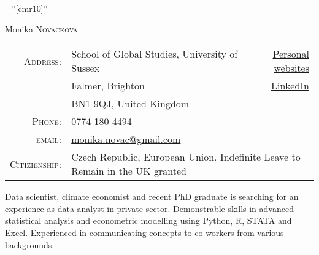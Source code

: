 \documentclass[a4paper,10pt]{article}
\begin{document}

\pagestyle{empty} %

\font\fb=''[cmr10]'' %

\par{\centering
		{\Huge Monika \textsc{Novackova}
	}\bigskip\par}


\begin{tabular}{rlr}
 
    \textsc{Address:}   & School of Global Studies, University of Sussex&  \href{https://monikanovackova.github.io/0}{Personal websites} \\
 & Falmer, Brighton&  \href{https://www.linkedin.com/in/monika-novackova/}{LinkedIn}\\
  &BN1 9QJ, United Kingdom\\
    \textsc{Phone:}     & 0774 180 4494\\
    \textsc{email:}     & \href{mailto:monika.novac@gmail.com}{monika.novac@gmail.com}    \\
    
       \textsc{Citizienship:} & \multicolumn{2}{l}{Czech Republic, European Union. Indefinite Leave to Remain in the UK granted}
\end{tabular}

Data scientist, climate economist and recent PhD graduate is searching for an experience as data analyst in private sector. Demonstrable skills in advanced statistical analysis and econometric modelling using Python, R, STATA and Excel. Experienced in communicating concepts to co-workers from various backgrounds.



\end{document}
